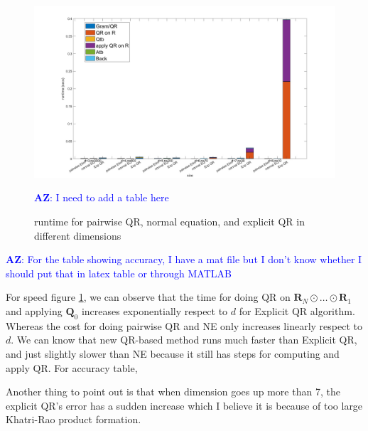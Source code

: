\documentclass{article}
\newcommand{\mat}[1]{\mathbf{#1}}
\newcommand{\AZ}[1]{\textcolor{blue}{\textbf{AZ}: #1}}
\begin{document}
\begin{figure}[ht!]
  
  \begin{center}
    \includegraphics*[scale = 0.2]{6dim.jpg}
    \caption[Figure]{runtime for pairwise QR, normal equation, and explicit QR in different dimensions \label{fig:LS_problem}}
    \AZ{I need to add a table here}
  \end{center}
    
\end{figure}
\AZ{For the table showing accuracy, I have a mat file but I don't know whether I should put that in latex table or through MATLAB}

For speed figure \cref{fig:LS_problem}, we can observe that the time for doing QR on $\mat{R}_N \odot \dots \odot \mat{R}_1$ and applying $\mat{Q}_0$ increases exponentially respect to $d$ for Explicit QR algorithm.
Whereas the cost for doing pairwise QR and NE only increases linearly respect to $d$.
We can know that new QR-based method runs much faster than Explicit QR, and just slightly slower than NE because it still has steps for computing and apply QR.
For accuracy table, 

Another thing to point out is that when dimension goes up more than 7, the explicit QR's error has a sudden increase which I believe it is because of too large Khatri-Rao product formation.
\end{document}
